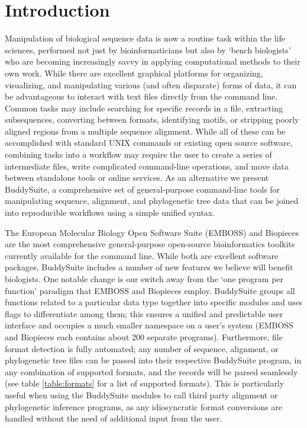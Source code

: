 \documentclass[nogrid]{MBE_article}%
\begin{document}
\section{{Introduction}\label{sec:Intro}}
Manipulation of biological sequence data is now a routine task within the life sciences, performed not just by bioinformaticians but also by `bench biologists' who are becoming increasingly savvy in applying computational methods to their own work. While there are excellent graphical platforms for organizing, visualizing, and manipulating various (and often disparate) forms of data, it can be advantageous to interact with text files directly from the command line. Common tasks may include searching for specific records in a file, extracting subsequences, converting between formats, identifying motifs, or stripping poorly aligned regions from a multiple sequence alignment. While all of these can be accomplished with standard UNIX commands or existing open source software, combining tasks into a workflow may require the user to create a series of intermediate files, write complicated command-line operations, and move data between standalone tools or online services. As an alternative we present BuddySuite, a comprehensive set of general-purpose command-line tools for manipulating sequence, alignment, and phylogenetic tree data that can be joined into reproducible workflows using a simple unified syntax.

The European Molecular Biology Open Software Suite (EMBOSS) \cite{Rice:2000wr} and Biopieces are the most comprehensive general-purpose open-source bioinformatics toolkits currently available for the command line. While both are excellent software packages, BuddySuite includes a number of new features we believe will benefit biologists. One notable change is our switch away from the `one program per function' paradigm that EMBOSS and Biopieces employ. BuddySuite groups all functions related to a particular data type together into specific modules and uses flags to differentiate among them; this ensures a unified and predictable user interface and occupies a much smaller namespace on a user's system (EMBOSS and Biopieces each contains about 200 separate programs). Furthermore, file format detection is fully automated; any number of sequence, alignment, or phylogenetic tree files can be passed into their respective BuddySuite program, in any combination of supported formats, and the records will be parsed seamlessly (see table \ref{table:formats} for a list of supported formats). This is particularly useful when using the BuddySuite modules to call third party alignment or phylogenetic inference programs, as any idiosyncratic format conversions are handled without the need of additional input from the user.
\end{document}
